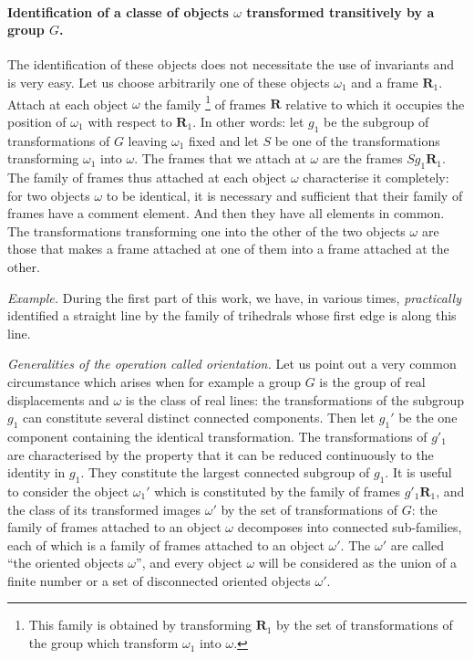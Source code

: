 \paragraph{Identification of a classe of objects $\omega$ transformed transitively by a group $G$.}
\label{sec:93}
The identification of these objects does not necessitate the use of invariants and is very easy. Let us choose arbitrarily one of these objects $\omega_{1}$ and a frame $\mathbf{R}_{1}$. Attach at each object $\omega$ the family \footnote{This family is obtained by transforming $\mathbf{R}_{1}$ by the set of transformations of the group which transform $\omega_{1}$ into $\omega$.} of frames $\mathbf{R}$ relative to which it occupies the position of $\omega_{1}$ with respect to $\mathbf{R}_{1}$. In other words: let $g_{1}$ be the subgroup of transformations of $G$ leaving $\omega_{1}$ fixed and let $S$ be one of the transformations transforming $\omega_{1}$ into $\omega$. The frames that we attach at $\omega$ are the frames $Sg_{1}\mathbf{R}_{1}$. The family of frames thus attached at each object $\omega$ characterise it completely: for two objects $\omega$ to be identical, it is necessary and sufficient that their family of frames have a comment element. And then they have all elements in common. The transformations transforming one into the other of the two objects $\omega$ are those that makes a frame attached at one of them into a frame attached at the other.

\somespace

{\small
\emph{Example.} During the first part of this work, we have, in various times, \emph{practically} identified a straight line by the family of trihedrals whose first edge is along this line.
}

\somespace

\emph{Generalities of the operation called orientation.} Let us point out a very common circumstance which arises when for example a group $G$ is the group of real displacements and $\omega$ is the class of real lines: the transformations of the subgroup $g_{1}$ can constitute several distinct connected components. Then let $g_{1}'$ be the one component containing the identical transformation. The transformations of $g'_{1}$ are characterised by the property that it can be reduced continuously to the identity in $g_{1}$. They constitute the largest connected subgroup of $g_{1}$. It is useful to consider the object $\omega_{1}'$ which is constituted by the family of frames $g'_{1}\mathbf{R}_{1}$, and the class of its transformed images $\omega'$ by the set of transformations of $G$: the family of frames attached to an object $\omega$ decomposes into connected sub-families, each of which is a family of frames attached to an object $\omega'$. The $\omega'$ are called ``the oriented objects $\omega$'', and every object $\omega$ will be considered as the union of a finite number or a set of disconnected oriented objects $\omega'$.

